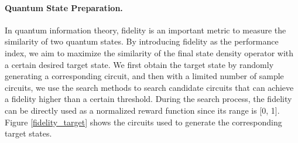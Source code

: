 \documentclass{article} %
\begin{document}
\paragraph{Quantum State Preparation.} In quantum information theory, fidelity \citep{liang2019quantum} is an important metric to measure the similarity of two quantum states. By introducing fidelity as the performance index, we aim to maximize the similarity of the final state density operator with a certain desired target state. We first obtain the target state by randomly generating a corresponding circuit, and then with a limited number of sample circuits, we use the search methods to search candidate circuits that can achieve a fidelity higher than a certain threshold. During the search process, the fidelity can be directly used as a normalized reward function since its range is [0, 1]. Figure \ref{fidelity_target} shows the circuits used to generate the corresponding target states.
\end{document}
